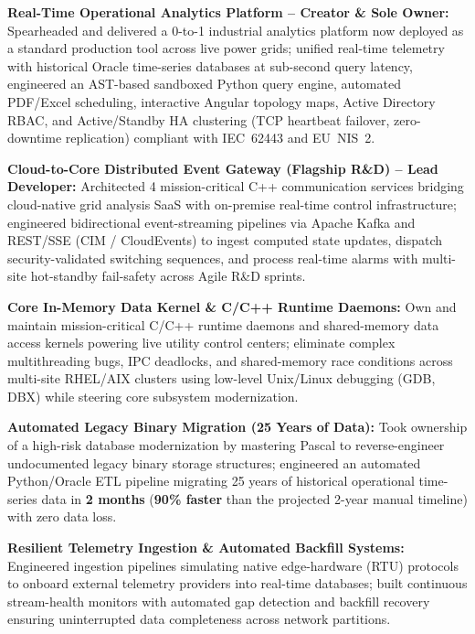 \documentclass[a4paper,10pt]{article}
\newcommand{\resumeItem}[1]{
  \item\small{#1}
}
\begin{document}
        \resumeItem{\textbf{Real-Time Operational Analytics Platform -- Creator \& Sole Owner:} Spearheaded and delivered a 0-to-1 industrial analytics platform now deployed as a standard production tool across live power grids; unified real-time telemetry with historical Oracle time-series databases at sub-second query latency, engineered an AST-based sandboxed Python query engine, automated PDF/Excel scheduling, interactive Angular topology maps, Active Directory RBAC, and Active/Standby HA clustering (TCP heartbeat failover, zero-downtime replication) compliant with IEC~62443 and EU~NIS~2.}

        \resumeItem{\textbf{Cloud-to-Core Distributed Event Gateway (Flagship R\&D) -- Lead Developer:} Architected 4 mission-critical C++ communication services bridging cloud-native grid analysis SaaS with on-premise real-time control infrastructure; engineered bidirectional event-streaming pipelines via Apache Kafka and REST/SSE (CIM / CloudEvents) to ingest computed state updates, dispatch security-validated switching sequences, and process real-time alarms with multi-site hot-standby fail-safety across Agile R\&D sprints.}

        \resumeItem{\textbf{Core In-Memory Data Kernel \& C/C++ Runtime Daemons:} Own and maintain mission-critical C/C++ runtime daemons and shared-memory data access kernels powering live utility control centers; eliminate complex multithreading bugs, IPC deadlocks, and shared-memory race conditions across multi-site RHEL/AIX clusters using low-level Unix/Linux debugging (GDB, DBX) while steering core subsystem modernization.}

        \resumeItem{\textbf{Automated Legacy Binary Migration (25 Years of Data):} Took ownership of a high-risk database modernization by mastering Pascal to reverse-engineer undocumented legacy binary storage structures; engineered an automated Python/Oracle ETL pipeline migrating 25 years of historical operational time-series data in \textbf{2 months} (\textbf{90\% faster} than the projected 2-year manual timeline) with zero data loss.}

        \resumeItem{\textbf{Resilient Telemetry Ingestion \& Automated Backfill Systems:} Engineered ingestion pipelines simulating native edge-hardware (RTU) protocols to onboard external telemetry providers into real-time databases; built continuous stream-health monitors with automated gap detection and backfill recovery ensuring uninterrupted data completeness across network partitions.}
\end{document}
